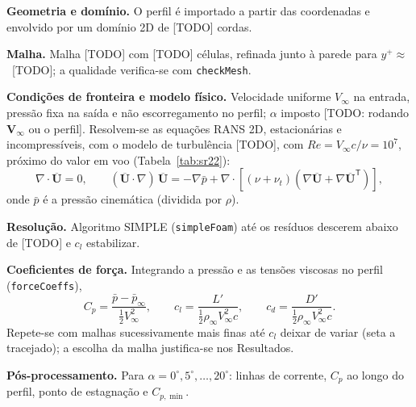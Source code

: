 \begin{etapas}
  \item \textbf{Geometria e domínio.} O perfil é importado a partir das
  coordenadas e envolvido por um domínio 2D de [TODO] cordas.
  \item \textbf{Malha.} Malha [TODO] com [TODO] células, refinada junto à parede
  para $y^+ \approx$~[TODO]; a qualidade verifica-se com \texttt{checkMesh}.
  \item \textbf{Condições de fronteira e modelo físico.} Velocidade uniforme
  $V_\infty$ na entrada, pressão fixa na saída e não escorregamento no perfil;
  $\alpha$ imposto [TODO: rodando $\mathbf{V}_\infty$ ou o perfil]. Resolvem-se as
  equações RANS 2D, estacionárias e incompressíveis, com o modelo de turbulência
  [TODO], com $Re = V_\infty c/\nu = 10^{7}$, próximo do valor em voo
  (Tabela~\ref{tab:sr22}):
  \[
    \nabla\cdot\overline{\mathbf{U}} = 0, \qquad
    (\overline{\mathbf{U}}\cdot\nabla)\,\overline{\mathbf{U}} =
    -\nabla \bar{p} + \nabla\cdot\left[(\nu + \nu_t)
    \left(\nabla\overline{\mathbf{U}} + \nabla\overline{\mathbf{U}}^{\mathsf{T}}\right)\right],
  \]
  onde $\bar{p}$ é a pressão cinemática (dividida por $\rho$).
  \item \textbf{Resolução.} Algoritmo SIMPLE (\texttt{simpleFoam}) até os
  resíduos descerem abaixo de [TODO] e $c_l$ estabilizar.
  \item \textbf{Coeficientes de força.} Integrando a pressão e as tensões
  viscosas no perfil (\texttt{forceCoeffs}),
  \[
    C_p = \frac{\bar{p} - \bar{p}_\infty}{\tfrac{1}{2}V_\infty^2}, \qquad
    c_l = \frac{L'}{\tfrac{1}{2}\rho_\infty V_\infty^2 c}, \qquad
    c_d = \frac{D'}{\tfrac{1}{2}\rho_\infty V_\infty^2 c}.
  \]
  Repete-se com malhas sucessivamente mais finas até $c_l$ deixar de variar
  (seta a tracejado); a escolha da malha justifica-se nos Resultados.
  \item \textbf{Pós-processamento.} Para $\alpha = 0^\circ, 5^\circ, \dots,
  20^\circ$: linhas de corrente, $C_p$ ao longo do perfil, ponto de estagnação e
  $C_{p,\min}$.
\end{etapas}

